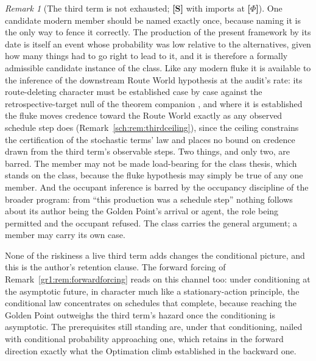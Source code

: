 \documentclass[11pt]{article}
\theoremstyle{plain}
\theoremstyle{definition}
\theoremstyle{remark}
\newtheorem{remark}[theorem]{Remark}
\begin{document}
\begin{remark}[The third term is not exhausted; \textbf{[S]} with imports at \textbf{[$\Phi$]}]
One candidate modern member should be named exactly once, because
naming it is the only way to fence it correctly. The production of
the present framework by its date is itself an event whose
probability was low relative to the alternatives, given how many
things had to go right to lead to it, and it is therefore a formally
admissible candidate instance of the class. Like any modern fluke it
is available to the inference of the downstream Route World hypothesis at
the audit's rate: its route-deleting character must be established
case by case against the retrospective-target null of
the theorem companion \cite{TargetedB1}, and where it is established the
fluke moves credence toward the Route World exactly as any observed
schedule step does (Remark~\ref{sch:rem:thirdceiling}), since the
ceiling constrains the certification of the stochastic terms' law and
places no bound on credence drawn from the third term's observable
steps. Two things, and only two, are barred. The member may not be
made load-bearing for the class thesis, which stands on the class,
because the fluke hypothesis may simply be true of any one member.
And the occupant inference is barred by
the occupancy discipline of the broader program: from ``this production was a
schedule step'' nothing follows about its author being the Golden
Point's arrival or agent, the role being permitted and the occupant
refused. The class carries the general argument; a member may carry
its own case.

None of the riskiness a live third term adds changes the conditional
picture, and this is the author's retention clause. The forward
forcing of Remark~\ref{gr1:rem:forwardforcing} reads on this channel
too: under conditioning at the asymptotic future, in character much
like a stationary-action principle, the conditional law concentrates
on schedules that complete, because reaching the Golden Point
outweighs the third term's hazard once the conditioning is
asymptotic. The prerequisites still standing are, under that
conditioning, nailed with conditional probability approaching one,
which retains in the forward direction exactly what the Optimation
climb established in the backward one.
\end{remark}
\end{document}
